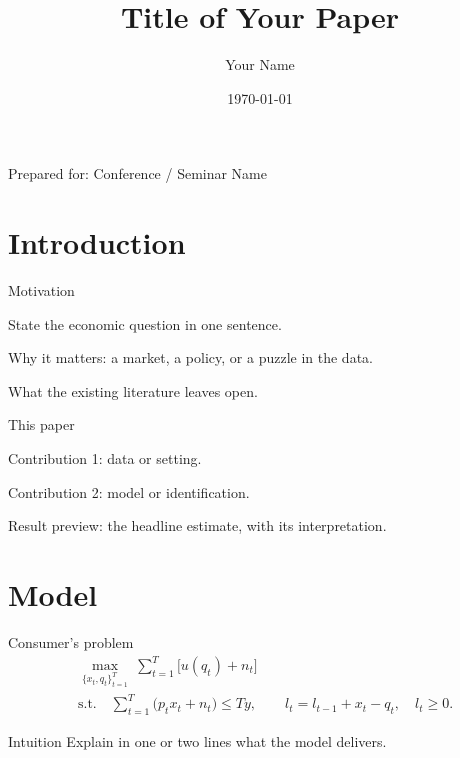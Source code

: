 \documentclass[aspectratio=169]{beamer}
\title[Short Title of Your Paper]{\large Title of Your Paper}
\author[Your Name]{Your Name}
\institute[]{Northeastern University}
\date[]{\today}
\newenvironment{wideitemize}{\itemize\addtolength{\itemsep}{10pt}}{\enditemize}
\begin{document}
\begin{frame}
  \titlepage
  \vfill
  \begin{center}\scriptsize Prepared for: Conference / Seminar Name\end{center}
\end{frame}

\section{Introduction}
\begin{frame}{Motivation}
  \begin{wideitemize}
    \item State the economic question in one sentence.
    \item Why it matters: a market, a policy, or a puzzle in the data.
    \item What the existing literature leaves open.
  \end{wideitemize}
\end{frame}

\begin{frame}{This paper}
  \begin{wideitemize}
    \item Contribution 1: data or setting.
    \item Contribution 2: model or identification.
    \pause
    \item Result preview: the headline estimate, with its interpretation.
  \end{wideitemize}
\end{frame}

\section{Model}
\begin{frame}{Consumer's problem}
\begin{equation}
\begin{aligned}
&\max_{\{x_t,q_t\}_{t=1}^T}\ \sum_{t=1}^T \bigl[u(q_t)+n_t\bigr]\\
&\text{s.t.}\quad \sum_{t=1}^T \bigl(p_t x_t + n_t\bigr)\le T y,\qquad
 l_t=l_{t-1}+x_t-q_t,\quad l_t\ge 0 .
\end{aligned}
\end{equation}
\begin{block}{Intuition}
Explain in one or two lines what the model delivers.
\end{block}
\end{frame}
\end{document}
